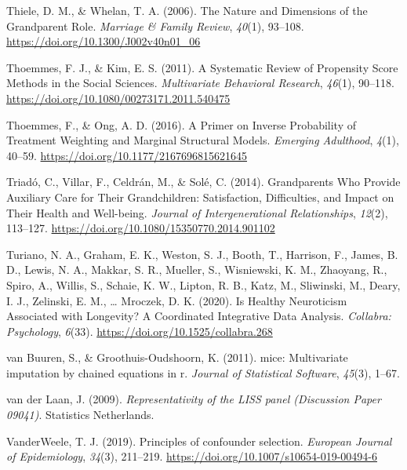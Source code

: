 \documentclass[
  english,
  man, noextraspace]{apa7}
\begin{document}
\leavevmode\hypertarget{ref-thieleNatureDimensionsGrandparent2006a}{}%
Thiele, D. M., \& Whelan, T. A. (2006). The Nature and Dimensions of the Grandparent Role. \emph{Marriage \& Family Review}, \emph{40}(1), 93--108. \url{https://doi.org/10.1300/J002v40n01_06}

\leavevmode\hypertarget{ref-thoemmesSystematicReviewPropensity2011}{}%
Thoemmes, F. J., \& Kim, E. S. (2011). A Systematic Review of Propensity Score Methods in the Social Sciences. \emph{Multivariate Behavioral Research}, \emph{46}(1), 90--118. \url{https://doi.org/10.1080/00273171.2011.540475}

\leavevmode\hypertarget{ref-thoemmesPrimerInverseProbability2016}{}%
Thoemmes, F., \& Ong, A. D. (2016). A Primer on Inverse Probability of Treatment Weighting and Marginal Structural Models. \emph{Emerging Adulthood}, \emph{4}(1), 40--59. \url{https://doi.org/10.1177/2167696815621645}

\leavevmode\hypertarget{ref-triadoGrandparentsWhoProvide2014}{}%
Triadó, C., Villar, F., Celdrán, M., \& Solé, C. (2014). Grandparents Who Provide Auxiliary Care for Their Grandchildren: Satisfaction, Difficulties, and Impact on Their Health and Well-being. \emph{Journal of Intergenerational Relationships}, \emph{12}(2), 113--127. \url{https://doi.org/10.1080/15350770.2014.901102}

\leavevmode\hypertarget{ref-turianoHealthyNeuroticismAssociated2020}{}%
Turiano, N. A., Graham, E. K., Weston, S. J., Booth, T., Harrison, F., James, B. D., Lewis, N. A., Makkar, S. R., Mueller, S., Wisniewski, K. M., Zhaoyang, R., Spiro, A., Willis, S., Schaie, K. W., Lipton, R. B., Katz, M., Sliwinski, M., Deary, I. J., Zelinski, E. M., \ldots{} Mroczek, D. K. (2020). Is Healthy Neuroticism Associated with Longevity? A Coordinated Integrative Data Analysis. \emph{Collabra: Psychology}, \emph{6}(33). \url{https://doi.org/10.1525/collabra.268}

\leavevmode\hypertarget{ref-mice2011}{}%
van Buuren, S., \& Groothuis-Oudshoorn, K. (2011). mice: Multivariate imputation by chained equations in r. \emph{Journal of Statistical Software}, \emph{45}(3), 1--67.

\leavevmode\hypertarget{ref-vanderlaanRepresentativityLISSPanel2009}{}%
van der Laan, J. (2009). \emph{Representativity of the LISS panel (Discussion Paper 09041)}. Statistics Netherlands.

\leavevmode\hypertarget{ref-vanderweelePrinciplesConfounderSelection2019}{}%
VanderWeele, T. J. (2019). Principles of confounder selection. \emph{European Journal of Epidemiology}, \emph{34}(3), 211--219. \url{https://doi.org/10.1007/s10654-019-00494-6}
\end{document}
